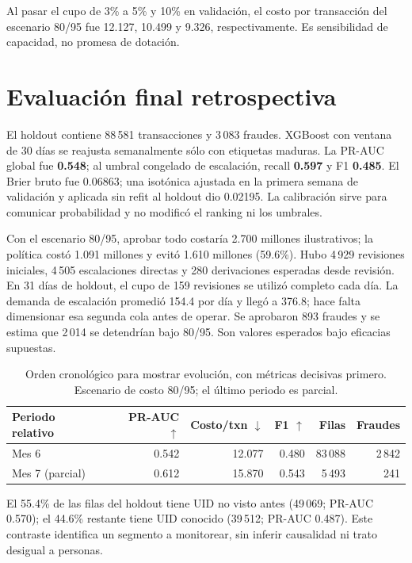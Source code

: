 \documentclass[11pt,letterpaper]{article}
\begin{document}
Al pasar el cupo de 3\% a 5\% y 10\% en validación, el costo por transacción del escenario 80/95 fue 12.127, 10.499 y 9.326, respectivamente. Es sensibilidad de capacidad, no promesa de dotación.

\clearpage
\section{Evaluación final retrospectiva}
El holdout contiene 88\,581 transacciones y 3\,083 fraudes. XGBoost con ventana de 30 días se reajusta semanalmente sólo con etiquetas maduras. La PR-AUC global fue \textbf{0.548}; al umbral congelado de escalación, recall \textbf{0.597} y F1 \textbf{0.485}. El Brier bruto fue 0.06863; una isotónica ajustada en la primera semana de validación y aplicada sin refit al holdout dio 0.02195. La calibración sirve para comunicar probabilidad y no modificó el ranking ni los umbrales.

Con el escenario 80/95, aprobar todo costaría 2.700 millones ilustrativos; la política costó 1.091 millones y evitó 1.610 millones (59.6\%). Hubo 4\,929 revisiones iniciales, 4\,505 escalaciones directas y 280 derivaciones esperadas desde revisión. En 31 días de holdout, el cupo de 159 revisiones se utilizó completo cada día. La demanda de escalación promedió 154.4 por día y llegó a 376.8; hace falta dimensionar esa segunda cola antes de operar. Se aprobaron 893 fraudes y se estima que 2\,014 se detendrían bajo 80/95. Son valores esperados bajo eficacias supuestas.

\begin{table}[H]\centering\small
\begin{tabular}{@{}lrrrrr@{}}\toprule
Periodo relativo & PR-AUC $\uparrow$ & Costo/txn $\downarrow$ & F1 $\uparrow$ & Filas & Fraudes\\\midrule
Mes 6 & 0.542 & 12.077 & 0.480 & 83\,088 & 2\,842\\
Mes 7 (parcial) & 0.612 & 15.870 & 0.543 & 5\,493 & 241\\\bottomrule
\end{tabular}
\caption{Orden cronológico para mostrar evolución, con métricas decisivas primero. Escenario de costo 80/95; el último periodo es parcial.}
\end{table}

El 55.4\% de las filas del holdout tiene UID no visto antes (49\,069; PR-AUC 0.570); el 44.6\% restante tiene UID conocido (39\,512; PR-AUC 0.487). Este contraste identifica un segmento a monitorear, sin inferir causalidad ni trato desigual a personas.
\end{document}

